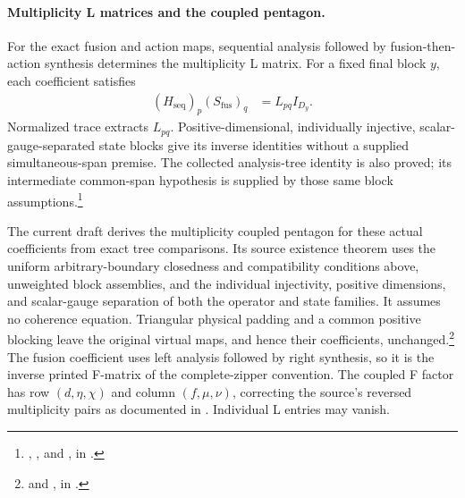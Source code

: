 \documentclass{article}
\begin{document}
\paragraph{Multiplicity L matrices and the coupled pentagon.}
For the exact fusion and action maps, sequential analysis followed by
fusion-then-action synthesis determines the multiplicity L matrix.
For a fixed final block $y$, each coefficient satisfies
\begin{align}
    (H_{\mathrm{seq}})_p(S_{\mathrm{fus}})_q
     & =L_{pq}I_{D_y}.
    \label{eq:glm23_exact_l_contraction}
\end{align}
Normalized trace extracts $L_{pq}$. Positive-dimensional, individually
injective, scalar-gauge-separated state blocks give its inverse identities
without a supplied simultaneous-span premise. The collected analysis-tree
identity is also proved; its intermediate common-span hypothesis is
supplied by those same block assumptions.\footnote{
    ,
    , and
    , in
    .}

The current draft  derives the multiplicity coupled pentagon
for these actual coefficients from exact tree comparisons. Its source
existence theorem uses the uniform arbitrary-boundary closedness and
compatibility conditions above, unweighted block assemblies, and the
individual injectivity, positive dimensions, and scalar-gauge separation
of both the operator and state families. It assumes no coherence equation.
Triangular physical padding and a common positive blocking leave the
original virtual maps, and hence their coefficients, unchanged.\footnote{
     and
    , in
    .}
The fusion coefficient uses left analysis followed by right synthesis,
so it is the inverse printed F-matrix of the complete-zipper convention.
The coupled F factor has row $(d,\eta,\chi)$ and column $(f,\mu,\nu)$,
correcting the source's reversed multiplicity pairs as documented in
. Individual L entries may vanish.
\end{document}
